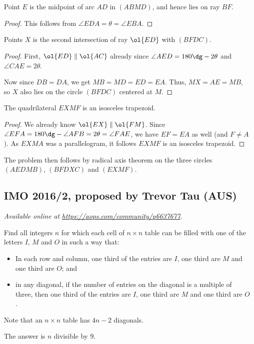 \documentclass[11pt]{scrartcl}
\begin{document}
\begin{claim*}
  Point $E$ is the midpoint of arc $\widehat{AD}$
  in $(ABMD)$, and hence lies on ray $BF$.
\end{claim*}
\begin{proof}
  This follows from
  $\angle EDA = \theta = \angle EBA$.
\end{proof}


\begin{claim*}
  Points $X$ is the second intersection of ray $\ol{ED}$
  with $(BFDC)$.
\end{claim*}
\begin{proof}
  First, $\ol{ED} \parallel \ol{AC}$ already since
  $\angle AED = 180\dg - 2\theta$
  and $\angle CAE = 2\theta$.

  Now since $DB = DA$, we get $MB = MD = ED = EA$.
  Thus, $MX = AE = MB$,
  so $X$ also lies on the circle $(BFDC)$ centered at $M$.
\end{proof}

\begin{claim*}
  The quadrilateral $EXMF$ is an isosceles trapezoid.
\end{claim*}
\begin{proof}
  We already know $\ol{EX} \parallel \ol{FM}$.
  Since $\angle EFA = 180\dg - \angle AFB = 2\theta = \angle FAE$,
  we have $EF = EA$ as well (and $F \neq A$).
  As $EXMA$ was a parallelogram,
  it follows $EXMF$ is an isosceles trapezoid.
\end{proof}

The problem then follows by radical axis theorem
on the three circles $(AEDMB)$, $(BFDXC)$ and $(EXMF)$.
\pagebreak

\subsection{IMO 2016/2, proposed by Trevor Tau (AUS)}
\textsl{Available online at \url{https://aops.com/community/p6637677}.}
\begin{mdframed}[style=mdpurplebox,frametitle={Problem statement}]
Find all integers $n$ for which each cell of $n \times n$ table
can be filled with one of the letters $I$, $M$ and $O$ in such a way that:
\begin{itemize}
\item In each row and column,  one third of the entries are $I$,
one third are $M$ and one third are $O$; and
\item in any diagonal, if the number of entries on the diagonal is a multiple of three,
then one third of the entries are $I$, one third are $M$ and one third are $O$.
\end{itemize}
Note that an $n \times n$ table has $4n-2$ diagonals.
\end{mdframed}
The answer is $n$ divisible by $9$.
\end{document}
